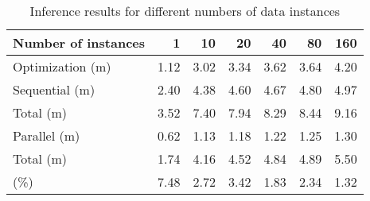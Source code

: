 \begin{table*}
  \centering
  \caption{Inference results for different numbers of data instances}
  \ttfamily
  \begin{tabular}{lrrrrrr}
    \toprule
    \textnormal{Number of instances} &    1 &   10 &   20 &   40 &   80 &  160 \\
    \midrule
    \textnormal{Optimization (m)}    & 1.12 & 3.02 & 3.34 & 3.62 & 3.64 & 4.20 \\
    \midrule
    \textnormal{Sequential (m)}      & 2.40 & 4.38 & 4.60 & 4.67 & 4.80 & 4.97 \\
    \textnormal{Total (m)}           & 3.52 & 7.40 & 7.94 & 8.29 & 8.44 & 9.16 \\
    \midrule
    \textnormal{Parallel (m)}        & 0.62 & 1.13 & 1.18 & 1.22 & 1.25 & 1.30 \\
    \textnormal{Total (m)}           & 1.74 & 4.16 & 4.52 & 4.84 & 4.89 & 5.50 \\
    \midrule
    \textnormal{\up{NRMSE} (\%)}     & 7.48 & 2.72 & 3.42 & 1.83 & 2.34 & 1.32 \\
    \bottomrule
  \end{tabular}
\end{table*}

